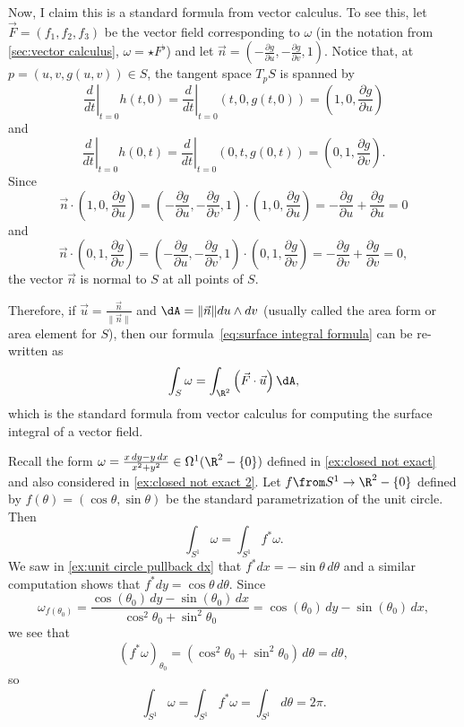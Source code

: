 \begin{example}
	Now, I claim this is a standard formula from vector calculus. To see this, let $\vec{F} = (f_1, f_2, f_3)$ be the vector field corresponding to $\omega$ (in the notation from \cref{sec:vector calculus}, $\omega = \star F^\flat$) and let $\vec{n} = \left( -\frac{\partial g}{\partial u}, -\frac{\partial g}{\partial v}, 1\right)$. Notice that, at $p = (u,v,g(u,v)) \in S$, the tangent space $T_pS$ is spanned by
	\[
		\left. \frac{d}{dt} \right|_{t=0} h(t,0) = \left. \frac{d}{dt} \right|_{t=0} (t,0,g(t,0)) = \left( 1, 0 , \frac{\partial g}{\partial u} \right)
	\]
	and
	\[
		\left. \frac{d}{dt} \right|_{t=0} h(0,t) = \left. \frac{d}{dt} \right|_{t=0} (0,t,g(0,t)) = \left( 0,1 , \frac{\partial g}{\partial v} \right).
	\]
	Since
	\[
		\vec{n} \cdot \left( 1, 0 , \frac{\partial g}{\partial u} \right) = \left( -\frac{\partial g}{\partial u}, -\frac{\partial g}{\partial v}, 1\right) \cdot \left( 1, 0 , \frac{\partial g}{\partial u} \right) = -\frac{\partial g}{\partial u} + \frac{\partial g}{\partial u}  = 0
	\]
	and
	\[
		\vec{n} \cdot \left( 0,1 , \frac{\partial g}{\partial v} \right) = \left( -\frac{\partial g}{\partial u}, -\frac{\partial g}{\partial v}, 1\right) \cdot \left(0,1 , \frac{\partial g}{\partial v} \right) = -\frac{\partial g}{\partial v} + \frac{\partial g}{\partial v}  = 0,
	\]
	the vector $\vec{n}$ is normal to $S$ at all points of $S$. 
	
	Therefore, if $\vec{u} = \frac{\vec{n}}{\|\vec{n}\|}$ and $\dA = \|\vec{n}\| du \wedge dv$ (usually called the area form or area element for $S$), then our formula~\eqref{eq:surface integral formula} can be re-written as
	\[
		\int_S \omega = \int_{\R^2} \left(\vec{F} \cdot \vec{u}\right) \dA,
	\]
	which is the standard formula from vector calculus for computing the surface integral of a vector field.
\end{example}

\begin{example}
	Recall the form $\omega = \frac{x \, dy - y \, dx}{x^2 + y^2} \in \Omega^1(\R^2 -\{0\})$ defined in \cref{ex:closed not exact} and also considered in \cref{ex:closed not exact 2}. Let $f \from S^1 \to \R^2 -\{0\}$ defined by $f(\theta) = (\cos \theta , \sin \theta)$ be the standard parametrization of the unit circle. Then
	\[
		\int_{S^1} \omega = \int_{S^1} f^\ast \omega.
	\]
	We saw in \cref{ex:unit circle pullback dx} that $f^\ast dx = -\sin\theta\, d\theta$ and a similar computation shows that $f^\ast dy = \cos \theta\, d\theta$. Since
	\[
		\omega_{f(\theta_0)} = \frac{\cos(\theta_0) \, dy - \sin(\theta_0) \, dx}{\cos^2 \theta_0 + \sin^2\theta_0} = \cos(\theta_0) \, dy - \sin(\theta_0) \, dx,
	\]
	we see that
	\[
		(f^\ast \omega)_{\theta_0} = (\cos^2\theta_0 + \sin^2\theta_0)\, d\theta = d\theta,
	\]
	so
	\[
		\int_{S^1} \omega = \int_{S^1} f^\ast \omega = \int_{S^1} d\theta = 2\pi.
	\]
\end{example}
